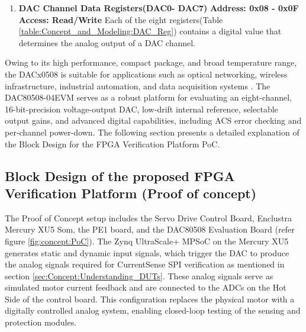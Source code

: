 \begin{enumerate}
	\item \textbf{\acs{DAC} Channel Data Registers(DAC0- DAC7)} \newline
	\textbf{Address: 0x08 - 0x0F \textbar\space Access: Read/Write} \newline
	Each of the eight registers(Table \ref{table:Concept_and_Modeling:DAC_Reg})  contains a digital value that determines the analog output of a \acs{DAC} channel.

	\begin{table}[htbp]
		\centering
		\caption{\textbf{DACx Registers (Addresses = 0x08 to 0x0F) \cite{TI_DAC80508}}}
		\label{table:Concept_and_Modeling:DAC_Reg}
		\setlength{\fboxsep}{0pt}
	\end{table}
\end{enumerate}

Owing to its high performance, compact package, and broad temperature range, the DACx0508 is suitable for applications such as optical networking, wireless infrastructure, industrial automation, and data acquisition systems \cite{TI_DAC80508_EVM_Guide}. The DAC80508-04EVM serves as a robust platform for evaluating an eight-channel, 16-bit-precision voltage-output \acs{DAC}, low-drift internal reference, selectable output gains, and advanced digital capabilities, including \acs{ACS} error checking and per-channel power-down. The following section presents a detailed explanation of the Block Design for the \acs{FPGA} Verification Platform \acs{PoC}.
	
\subsection{Block Design of the proposed \acs{FPGA} Verification Platform (Proof of concept)}

The Proof of Concept setup includes the Servo Drive Control Board, Enclustra Mercury XU5 Som, the PE1 board, and the DAC80508 Evaluation Board (refer figure \ref{fig:concept:PoC}). The Zynq UltraScale+ \acs{MPSoC} on the Mercury XU5 generates static and dynamic input signals, which trigger the \acs{DAC} to produce the analog signals required for CurrentSense \acs{SPI} verification as mentioned in section \ref{sec:Concept:Understanding_DUTs}. These analog signals serve as simulated motor current feedback and are connected to the \acs{ADC}s on the Hot Side of the control board. This configuration replaces the physical motor with a digitally controlled analog system, enabling closed-loop testing of the sensing and protection modules.

